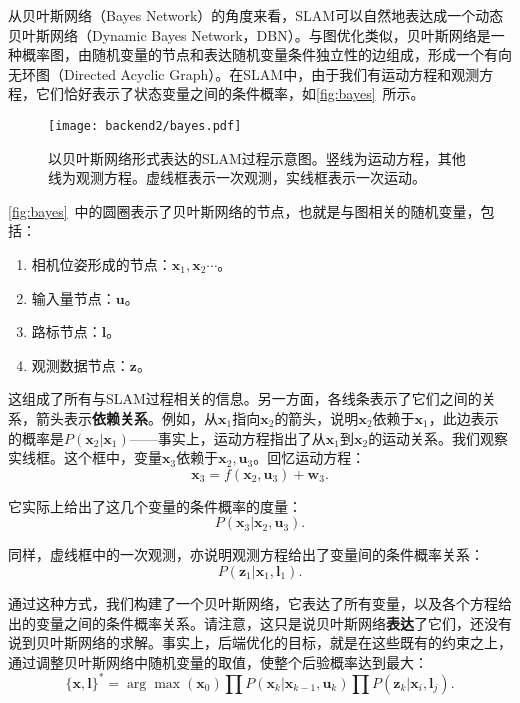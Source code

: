 从贝叶斯网络（Bayes Network）的角度来看，SLAM可以自然地表达成一个动态贝叶斯网络（Dynamic Bayes Network，DBN）。与图优化类似，贝叶斯网络是一种概率图，由随机变量的节点和表达随机变量条件独立性的边组成，形成一个有向无环图（Directed Acyclic Graph）。在SLAM中，由于我们有运动方程和观测方程，它们恰好表示了状态变量之间的条件概率，如\autoref{fig:bayes}~所示。

\begin{figure}[!ht]
	\centering
	\texttt{[image: backend2/bayes.pdf]}
	\caption{以贝叶斯网络形式表达的SLAM过程示意图。竖线为运动方程，其他线为观测方程。虚线框表示一次观测，实线框表示一次运动。}
	\label{fig:bayes}
\end{figure}

\autoref{fig:bayes}~中的圆圈表示了贝叶斯网络的节点，也就是与图相关的随机变量，包括：
\begin{enumerate}
	\item 相机位姿形成的节点：$\bm{x}_1, \bm{x}_2 \cdots$。
	\item 输入量节点：$\bm{u}$。
	\item 路标节点：$\bm{l}$。
	\item 观测数据节点：$\bm{z}$。
\end{enumerate}

这组成了所有与SLAM过程相关的信息。另一方面，各线条表示了它们之间的关系，箭头表示\textbf{依赖关系}。例如，从$\bm{x}_1$指向$\bm{x}_2$的箭头，说明$\bm{x}_2$依赖于$\bm{x}_1$，此边表示的概率是$P(\bm{x}_2 | \bm{x}_1 )$——事实上，运动方程指出了从$\bm{x}_1$到$\bm{x}_2$的运动关系。我们观察实线框。这个框中，变量$\bm{x}_3$依赖于$\bm{x}_2, \bm{u}_3$。回忆运动方程：
\clearpage
\begin{equation}
\bm{x}_3 = f(\bm{x}_2, \bm{u}_3) + \bm{w}_3.
\end{equation}

它实际上给出了这几个变量的条件概率的度量：
\begin{equation}
P(\bm{x}_3 | \bm{x}_2, \bm{u}_3 ).
\end{equation}

同样，虚线框中的一次观测，亦说明观测方程给出了变量间的条件概率关系：
\begin{equation}
P(\bm{z}_1 | \bm{x}_1, \bm{l}_1 ).
\end{equation}

通过这种方式，我们构建了一个贝叶斯网络，它表达了所有变量，以及各个方程给出的变量之间的条件概率关系。请注意，这只是说贝叶斯网络\textbf{表达}了它们，还没有说到贝叶斯网络的求解。事实上，后端优化的目标，就是在这些既有的约束之上，通过调整贝叶斯网络中随机变量的取值，使整个后验概率达到最大：
\begin{equation}
\{ \bm{x}, \bm{l} \}^* = \arg \max \left( {{\bm{x}_0}} \right)\prod {P\left( {{\bm{x}_k}|{\bm{x}_{k - 1}},{\bm{u}_k}} \right)} \prod {P\left( {{\bm{z}_k}|{\bm{x}_i},{\bm{l}_j}} \right)} .
\end{equation}

